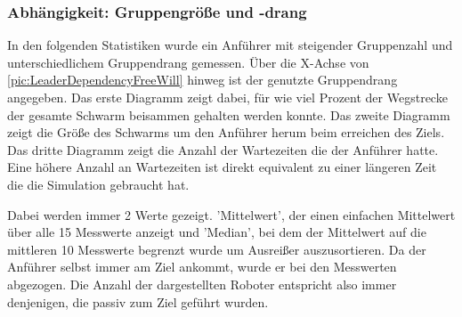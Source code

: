 %
%
%
%

\subsubsection*{Abhängigkeit: Gruppengröße und -drang}

In den folgenden Statistiken wurde ein Anführer mit steigender Gruppenzahl und unterschiedlichem Gruppendrang gemessen. Über die X-Achse von \autoref{pic:LeaderDependencyFreeWill} hinweg ist der genutzte Gruppendrang angegeben.
Das erste Diagramm zeigt dabei, für wie viel Prozent der Wegstrecke der gesamte Schwarm beisammen gehalten werden konnte.
Das zweite Diagramm zeigt die Größe des Schwarms um den Anführer herum beim erreichen des Ziels.
Das dritte Diagramm zeigt die Anzahl der Wartezeiten die der Anführer hatte. Eine höhere Anzahl an Wartezeiten ist direkt equivalent zu einer längeren Zeit die die Simulation gebraucht hat.

Dabei werden immer 2 Werte gezeigt. 'Mittelwert', der einen einfachen Mittelwert über alle 15 Messwerte anzeigt und 'Median', bei dem der Mittelwert auf die mittleren 10 Messwerte begrenzt wurde um Ausreißer auszusortieren. Da der Anführer selbst immer am Ziel ankommt, wurde er bei den Messwerten abgezogen. Die Anzahl der dargestellten Roboter entspricht also immer denjenigen, die passiv zum Ziel geführt wurden.

